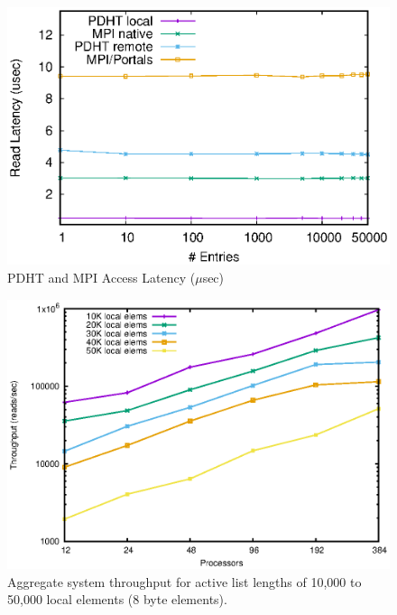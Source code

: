 \begin{figure}[ht]
  \center
  \includegraphics[width=.95\linewidth]{plots/mpilatency}
  \caption{PDHT and MPI Access Latency ($\mu$sec)}
  \label{fig:6}
\end{figure}

\begin{figure}
    \centering
    \includegraphics[width=.9\linewidth]{plots/throughput}
    \caption{Aggregate system throughput for active list lengths of 10,000 to 50,000 local elements (8 byte elements).}
    \label{fig:throughput}
\end{figure}

